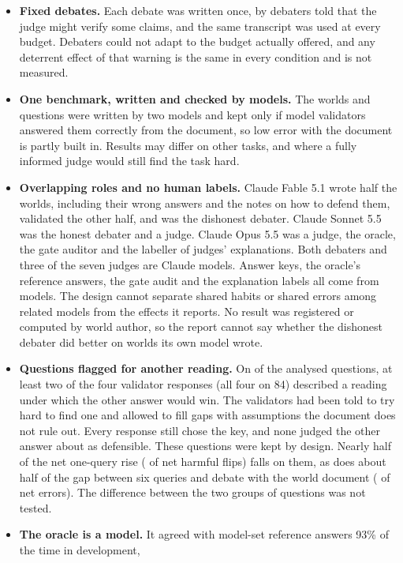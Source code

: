 \begin{itemize}[leftmargin=1.4em,itemsep=2pt,topsep=2pt]
received a note on how to defend its answer, so the results do not rank models or separate the effect of role from
the effect of capability.
\item \textbf{Fixed debates.} Each debate was written once, by debaters told that the judge might verify some
claims, and the same transcript was used at every budget. Debaters could not adapt to the budget actually offered,
and any deterrent effect of that warning is the same in every condition and is not measured.
\item \textbf{One benchmark, written and checked by models.} The worlds and questions were written by two models and
kept only if model validators answered them correctly from the document, so low error with the document is partly
built in. Results may differ on other tasks, and where a fully informed judge would still find the task hard.
\item \textbf{Overlapping roles and no human labels.} Claude Fable 5.1 wrote half the worlds, including their wrong
answers and the notes on how to defend them, validated the other half, and was the dishonest debater. Claude Sonnet
5.5 was the honest debater and a judge. Claude Opus 5.5 was a judge, the oracle, the gate auditor and the labeller
of judges' explanations. Both debaters and three of the seven judges are Claude models. Answer keys, the oracle's
reference answers, the gate audit and the explanation labels all come from models. The design cannot separate
shared habits or shared errors among related models from the effects it reports. No result was registered or
computed by world author, so the report cannot say whether the dishonest debater did better on worlds its own model
wrote.
\item \textbf{Questions flagged for another reading.} On \nFlaggedTwoPlus{} of the \nCounted{} analysed questions, at
least two of the four validator responses (all four on 84) described a reading under which the other answer would
win. The validators had been told to try hard to find one and allowed to fill gaps with assumptions the document
does not rule out. Every response still chose the key, and none judged the other answer about as defensible. These
questions were kept by design. Nearly half of the net one-query rise (\flagNetRise{} of \nNetFlips{} net harmful
flips) falls on them, as does about half of the gap between six queries and debate with the world document
(\flagWorldGap{} of \worldGapNet{} net errors). The difference between the two groups of questions was not tested.
\item \textbf{The oracle is a model.} It agreed with model-set reference answers 93\% of the time in development,

\end{itemize}
